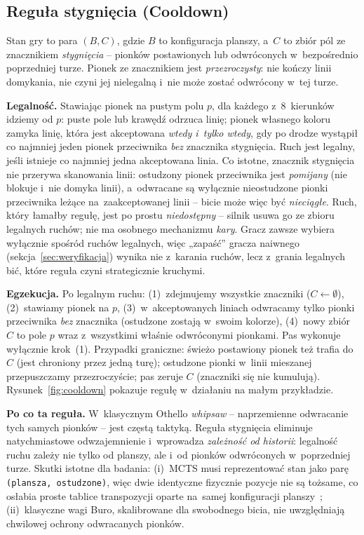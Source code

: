 \documentclass[12pt,a4paper]{article}
\begin{document}


\subsection{Reguła stygnięcia (Cooldown)}\label{sec:cooldown-rule}
Stan gry to para $(B, C)$, gdzie $B$ to konfiguracja planszy, a~$C$ to zbiór pól ze znacznikiem
\emph{stygnięcia} -- pionków postawionych lub odwróconych w~bezpośrednio poprzedniej turze. Pionek
ze znacznikiem jest \emph{przezroczysty}: nie kończy linii domykania, nie czyni jej nielegalną
i~nie może zostać odwrócony w~tej turze.

\textbf{Legalność.} Stawiając pionek na pustym polu $p$, dla każdego z~8~kierunków idziemy od $p$:
puste pole lub krawędź odrzuca linię; pionek własnego koloru zamyka linię, która jest akceptowana
\emph{wtedy i~tylko wtedy}, gdy po drodze wystąpił co najmniej jeden pionek przeciwnika \emph{bez}
znacznika stygnięcia. Ruch jest legalny, jeśli istnieje co najmniej jedna akceptowana linia.
Co istotne, znacznik stygnięcia nie przerywa skanowania linii: ostudzony pionek przeciwnika jest
\emph{pomijany} (nie blokuje i~nie domyka linii), a~odwracane są wyłącznie nieostudzone pionki
przeciwnika leżące na~zaakceptowanej linii -- bicie może więc być \emph{nieciągłe}. Ruch,
który łamałby regułę, jest po prostu \emph{niedostępny} -- silnik usuwa go ze zbioru legalnych
ruchów; nie ma osobnego mechanizmu \emph{kary}. Gracz zawsze wybiera wyłącznie spośród ruchów
legalnych, więc „zapaść” gracza naiwnego (sekcja~\ref{sec:weryfikacja}) wynika nie z~karania
ruchów, lecz z~grania legalnych bić, które reguła czyni strategicznie kruchymi.

\textbf{Egzekucja.} Po legalnym ruchu: (1)~zdejmujemy wszystkie znaczniki ($C\!\leftarrow\!\emptyset$),
(2)~stawiamy pionek na $p$, (3)~w~akceptowanych liniach odwracamy tylko pionki przeciwnika
\emph{bez} znacznika (ostudzone zostają w~swoim kolorze), (4)~nowy zbiór $C$ to pole $p$ wraz
z~wszystkimi właśnie odwróconymi pionkami. Pas wykonuje wyłącznie krok~(1). Przypadki graniczne:
świeżo postawiony pionek też trafia do $C$ (jest chroniony przez jedną turę); ostudzone pionki
w~linii mieszanej przepuszczamy przezroczyście; pas zeruje $C$ (znaczniki się nie kumulują).
Rysunek~\ref{fig:cooldown} pokazuje regułę w~działaniu na małym przykładzie.



\textbf{Po co ta reguła.} W~klasycznym Othello \emph{whipsaw} -- naprzemienne odwracanie tych
samych pionków -- jest częstą taktyką. Reguła stygnięcia eliminuje natychmiastowe odwzajemnienie
i~wprowadza \emph{zależność od historii}: legalność ruchu zależy nie tylko od planszy, ale i~od
pionków odwróconych w~poprzedniej turze. Skutki istotne dla badania: (i)~MCTS musi reprezentować
stan jako parę \texttt{(plansza, ostudzone)}, więc dwie identyczne fizycznie pozycje nie są
tożsame, co osłabia proste tablice transpozycji oparte na~samej konfiguracji planszy~\cite{childs2008transpositions}; (ii)~klasyczne wagi Buro,
skalibrowane dla swobodnego bicia, nie uwzględniają chwilowej ochrony odwracanych pionków.
\end{document}
